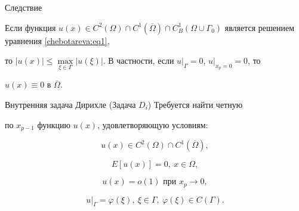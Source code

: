 \begin{newthm}{Следствие}


Если функция $u(x) \in C^2\left( \Omega \right) \cap C^1\left(


{\overline \Omega } \right) \cap C_B^1 \left( {\Omega \cup \Gamma


_0 } \right)$ является решением уравнения \eqref{chebotareva:eq1}, 


то $\left| {u(x)} \right| \le \mathop {\max }\limits_{\xi \in


\Gamma } \left| {u(\xi )} \right|$. В частности,  если $u\big|


_\Gamma = 0$,  $u\big|_{x_p = 0}   = 0$,  то


$u(x) \equiv 0$ в $\overline \Omega$.


\end{newthm}










\begin{newthm}


{Внутренняя задача Дирихле (Задача $D_i $)} Требуется найти четную


по $x_{p - 1} $ функцию $u(x)$,  удовлетворяющую условиям{\rm:}


\begin{equation}


\label{chebotareva:eq27} u(x) \in C^2\left( \Omega \right) \cap


C^1\left( {\overline \Omega } \right), 


\end{equation}


\begin{equation}


\label{chebotareva:eq28} E\left[ {u(x)} \right] = 0,  ~ x \in


\Omega , 


\end{equation}


\begin{equation}


\label{chebotareva:eq29} u\left( x \right) = o\left( 1


\right)\text{ при } x_p \to 0, 


\end{equation}


\begin{equation}


\label{chebotareva:eq30} u\big| _\Gamma = \varphi (\xi ), ~\xi \in \Gamma , ~\varphi (\xi ) \in C\left( \Gamma


\right).


\end{equation}


\end{newthm}


